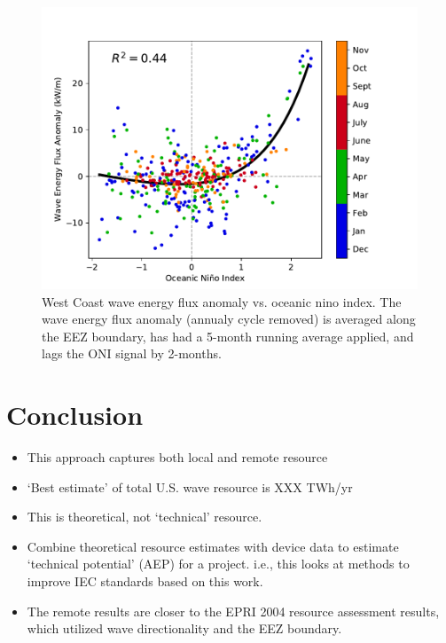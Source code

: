 \begin{figure}[ht]
  \centering
  \includegraphics[width=\textwidth]{../fig/ENSO-Comparison.wc.pdf}
  \caption{West Coast wave energy flux anomaly vs. oceanic nino index. The wave energy flux anomaly (annualy cycle removed) is averaged along the EEZ boundary, has had a 5-month running average applied, and lags the ONI signal by 2-months.}
  \label{fig:wc-nino}
\end{figure}

\section{Conclusion} \label{sec:conclusion}

\begin{itemize}
\item This approach captures both local and remote resource
\item ‘Best estimate’ of total U.S. wave resource is XXX TWh/yr
\item This is theoretical, not ‘technical’ resource.
\item Combine theoretical resource estimates with device data to estimate ‘technical potential’ (AEP) for a project. i.e., this looks at methods to improve IEC standards based on this work.
\item The remote results are closer to the EPRI 2004 resource assessment results, which utilized wave directionality and the EEZ boundary.
\end{itemize}


